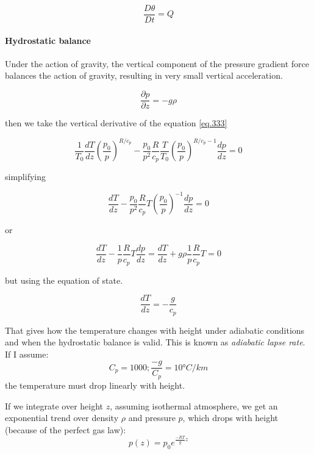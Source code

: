 \[\frac{D \theta}{Dt} = Q\]

\paragraph{Hydrostatic balance}
Under the action of gravity, the vertical component of the pressure
gradient force balances the action of gravity, resulting in very small
vertical acceleration.

\[\frac{\partial p}{\partial z} =  -g \rho\]

then we take the vertical derivative of the equation \ref{eq.333}

\[\frac{1}{T_0}\frac{d T}{dz}\left(\frac{p_0}{p}\right)^{R/c_p} -\frac{p_0}{p^2}\frac{R}{c_p}\frac{T}{T_0}\left(\frac{p_0}{p}\right)^{R/c_p-1}\frac{d p}{dz} = 0\]

simplifying

\[\frac{d T}{dz} -\frac{p_0}{p^2}\frac{R}{c_p}T\left(\frac{p_0}{p}\right)^{-1}\frac{d p}{dz} = 0\]

or

\[\frac{d T}{dz} -\frac{1}{p}\frac{R}{c_p}T\frac{d p}{dz} = \frac{d T}{dz} +g\rho\frac{1}{p}\frac{R}{c_p}T = 0\]

but using the equation of state.

\[\frac{d T}{dz} = -\frac{g}{c_p}\]

That gives how the temperature changes with height under adiabatic
conditions and when the hydrostatic balance is valid. This is known as \emph{adiabatic lapse rate}. If I assume:
$$C_p= 1000;   \frac{-g}{C_p} =10°C/km$$
the temperature must drop linearly with height.

If we integrate over height $z$, assuming isothermal atmosphere, we get an exponential trend over density $\rho$ and pressure $p$, which drops with height (because of the perfect gas law):
$$p(z)=p_0 e^{\frac{-RT}{g}z}$$
